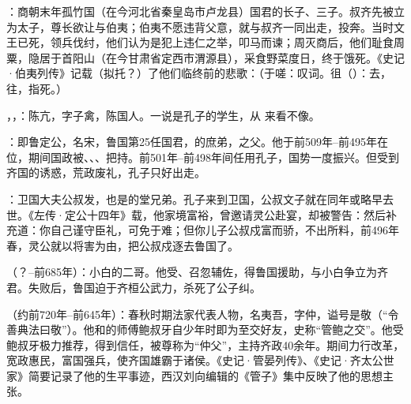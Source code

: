 ：商朝末年孤竹国（在今河北省秦皇岛市卢龙县）国君的长子、三子。叔齐先被立为太子，尊长欲让与伯夷；伯夷不愿违背父意，就与叔齐一同出走，投奔。当时文王已死，领兵伐纣，他们认为是犯上违仁之举，叩马而谏；周灭商后，他们耻食周粟，隐居于首阳山（在今甘肃省定西市渭源县），采食野菜度日，终于饿死。《史记·伯夷列传》记载（拟托？）了他们临终前的悲歌：（于嗟：叹词。徂（）：去，往，指死。）

，，：陈亢，字子禽，陈国人。一说是孔子的学生，从  来看不像。

：即鲁定公，名宋，鲁国第25任国君，的庶弟，之父。他于前509年--前495年在位，期间国政被、、、把持。前501年--前498年间任用孔子，国势一度振兴。但受到齐国的诱惑，荒政废礼，孔子只好出走。

：卫国大夫公叔发，也是的堂兄弟。孔子来到卫国，公叔文子就在同年或略早去世。《左传·定公十四年》载，他家境富裕，曾邀请灵公赴宴，却被警告：然后补充道：你自己谨守臣礼，可免于难；但你儿子公叔戍富而骄，不出所料，前496年春，灵公就以将害为由，把公叔戍逐去鲁国了。

（？--前685年）：小白的二哥。他受、召忽辅佐，得鲁国援助，与小白争立为齐君。失败后，鲁国迫于齐桓公武力，杀死了公子纠。

（约前720年--前645年）：春秋时期法家代表人物，名夷吾，字仲，谥号是敬（“令善典法曰敬”）。他和的师傅鲍叔牙自少年时即为至交好友，史称“管鲍之交”。他受鲍叔牙极力推荐，得到信任，被尊称为“仲父”，主持齐政40余年。期间力行改革，宽政惠民，富国强兵，使齐国雄霸于诸侯。《史记·管晏列传》、《史记·齐太公世家》简要记录了他的生平事迹，西汉刘向编辑的《管子》集中反映了他的思想主张。%


